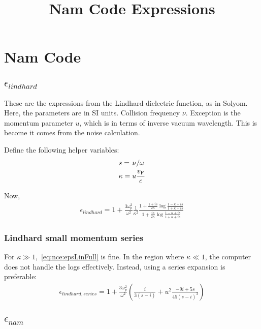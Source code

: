 \documentclass[../main.tex]{subfiles}
\title{Nam Code Expressions}
\author{}
\date{}
\begin{document}
	\onlyinsubfile{\maketitle}
	\onlyinsubfile{\tableofcontents}

	\section{Nam Code} \label{sec:nce}

	\subsection{$\epsilon_{lindhard}$} \label{subsec:nce:epsl}

	These are the expressions from the Lindhard dielectric function, as in Solyom\supercite{SolyomV3}.
	Here, the parameters are in SI units.
	Collision frequency $\nu$.
	Exception is the momentum parameter $u$, which is in terms of inverse vacuum wavelength.
	This is become it comes from the noise calculation.

	Define the following helper variables:
	\begin{gather}
		s = \flatfrac{\nu}{\omega} \\
		\kappa = u \frac{\vf}{c}
	\end{gather}

	Now,
	\begin{gather}
		\epsilon_{lindhard} = 1 + \frac{3 \omega_p^2}{\omega^2} \frac{1}{\kappa^2} \frac{1 +\frac{1 + is}{2 \kappa} \log \frac{1 - \kappa + i s}{1 + \kappa + i s}}{1 + \frac{is}{2 \kappa} \log \frac{1 - \kappa + i s}{1 + \kappa + i s}} \label{eq:nce:epsLinFull}
	\end{gather}

	\subsubsection{Lindhard small momentum series}

	For $\kappa \gg 1$,~\eqref{eq:nce:epsLinFull} is fine.
	In the region where $\kappa \ll 1$, the computer does not handle the logs effectively.
	Instead, using a series expansion is preferable:
	\begin{gather}
		\epsilon_{lindhard, series} = 1 + \frac{3 \omega_p^2}{\omega^2} \left(\frac{i}{3 (s - i)} + u^2  \frac{-9i + 5 s}{45 (s - i)^3} \right)
	\end{gather}

	\subsection{$\epsilon_{nam}$} \label{subsec:nce:epsn}
\end{document}
